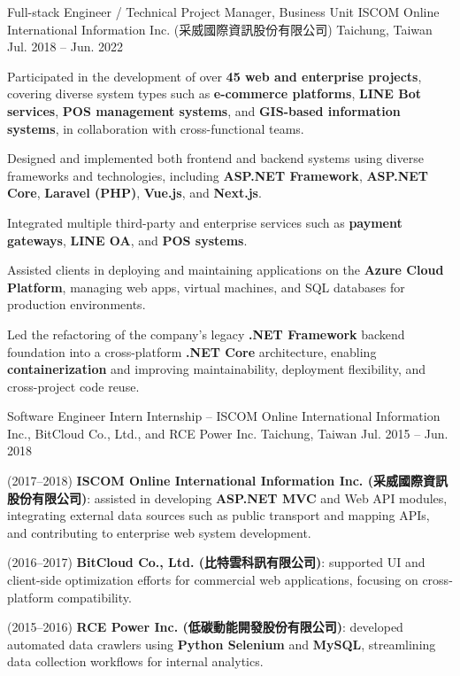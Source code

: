 \begin{cventries}
  \cventry
    {Full-stack Engineer / Technical Project Manager, Business Unit} %
    {ISCOM Online International Information Inc. (采威國際資訊股份有限公司)} %
    {Taichung, Taiwan} %
    {Jul. 2018 -- Jun. 2022} %
    {
      \begin{cvitems}
        \item {Participated in the development of over \textbf{45 web and enterprise projects}, covering diverse system types such as \textbf{e-commerce platforms}, \textbf{LINE Bot services}, \textbf{POS management systems}, and \textbf{GIS-based information systems}, in collaboration with cross-functional teams.}
        \item {Designed and implemented both frontend and backend systems using diverse frameworks and technologies, including \textbf{ASP.NET Framework}, \textbf{ASP.NET Core}, \textbf{Laravel (PHP)}, \textbf{Vue.js}, and \textbf{Next.js}.}
        \item {Integrated multiple third-party and enterprise services such as \textbf{payment gateways}, \textbf{LINE OA}, and \textbf{POS systems}.}
        \item {Assisted clients in deploying and maintaining applications on the \textbf{Azure Cloud Platform}, managing web apps, virtual machines, and SQL databases for production environments.}
        \item {Led the refactoring of the company's legacy \textbf{.NET Framework} backend foundation into a cross-platform \textbf{.NET Core} architecture, enabling \textbf{containerization} and improving maintainability, deployment flexibility, and cross-project code reuse.}
      \end{cvitems}
    }

  \cventry
    {Software Engineer Intern} %
    {Internship -- ISCOM Online International Information Inc., BitCloud Co., Ltd., and RCE Power Inc.} %
    {Taichung, Taiwan} %
    {Jul. 2015 -- Jun. 2018} %
    {
      \begin{cvitems}
        \item {(2017–2018) \textbf{ISCOM Online International Information Inc. (采威國際資訊股份有限公司)}: assisted in developing \textbf{ASP.NET MVC} and Web API modules, integrating external data sources such as public transport and mapping APIs, and contributing to enterprise web system development.}
        \item {(2016–2017) \textbf{BitCloud Co., Ltd. (比特雲科訊有限公司)}: supported UI and client-side optimization efforts for commercial web applications, focusing on cross-platform compatibility.}
        \item {(2015–2016) \textbf{RCE Power Inc. (低碳動能開發股份有限公司)}: developed automated data crawlers using \textbf{Python Selenium} and \textbf{MySQL}, streamlining data collection workflows for internal analytics.}
      \end{cvitems}
    }
\end{cventries}


